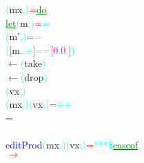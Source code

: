 \textcolor{cyan}{(}{\rm{}mx}\textcolor{cyan}{,}\textcolor{cyan}{)}\hsspace \textcolor{red}{=}\hsspace \textcolor{green}{\underline{do}}\\\hstab \hstab \textcolor{green}{\underline{let}}\hsspace \textcolor{cyan}{(}{\rm{}m}\hsspace \textcolor{cyan}{,}\hsspace \textcolor{cyan}{)}\hsspace \textcolor{red}{=}\hsspace \hsspace \hsspace \hsspace \hsspace \hsspace \hsspace {}\hsspace \textcolor{cyan}{=\tilde{ }}\\\hstab \hstab \hsspace \hsspace \hsspace \hsspace \textcolor{cyan}{(}{\rm{}m'}\textcolor{cyan}{,}\textcolor{cyan}{)}\hsspace \textcolor{red}{=}\hsspace \textcolor{cyan}{=\tilde{ }}\\\hstab {}\hsspace \textcolor{cyan}{(}\textcolor{red}{[}{\rm{}m}\textcolor{cyan}{,}\textcolor{cyan}{,}\hsspace \textcolor{cyan}{+}\textcolor{red}{]}\hsspace \textcolor{cyan}{==}\hsspace \textcolor{red}{[}\textcolor{magenta}{0}\textcolor{cyan}{,}\hsspace \textcolor{magenta}{0}\textcolor{cyan}{,}\textcolor{red}{]}\textcolor{cyan}{)}\\\hstab {}\hsspace \textcolor{red}{\ensuremath{\leftarrow}}\hsspace \textcolor{cyan}{(}{\rm{}take}\textcolor{cyan}{)}\\\hstab {}\hsspace \textcolor{red}{\ensuremath{\leftarrow}}\hsspace \textcolor{cyan}{(}{\rm{}drop}\textcolor{cyan}{)}\\\hstab {}\hsspace \textcolor{cyan}{(}{\rm{}vx}\textcolor{cyan}{,}\textcolor{cyan}{)}\\\hsspace \textcolor{cyan}{(}{\rm{}mx}\textcolor{cyan}{,}\textcolor{cyan}{)}\hsspace \textcolor{cyan}{(}{\rm{}vx}\textcolor{cyan}{,}\textcolor{cyan}{)}\hsspace \textcolor{red}{=}\hsspace \textcolor{cyan}{++}\\\hsspace \textcolor{red}{=}\\\\\textcolor{blue}{editProd}\hsspace \textcolor{cyan}{(}{\rm{}mx}\textcolor{cyan}{,}\textcolor{cyan}{)}\hsspace \textcolor{cyan}{(}{\rm{}vx}\textcolor{cyan}{,}\textcolor{cyan}{)}\hsspace \textcolor{red}{=}\hsspace \textcolor{cyan}{***}\hsspace \textcolor{cyan}{\$}\hsspace \textcolor{green}{\underline{case}}\hsspace \textcolor{green}{\underline{of}}\\\hsspace \textcolor{red}{\ensuremath{\rightarrow}}\hsspace 